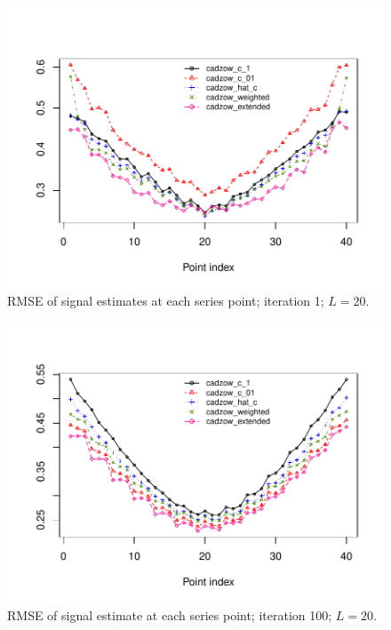 \documentclass[sii]{ipart}
\begin{document}
\begin{figure}[!hhh]
		\includegraphics[width = \columnwidth]{s1_it1.pdf}
		\caption{RMSE of signal estimates at each series point; iteration 1; $L=20$.}
		\label{fig:s1_it1}
\end{figure}

\begin{figure}[!hhh]
		\includegraphics[width = \columnwidth]{s1_it100.pdf}
		\caption{RMSE of signal estimate at each series point; iteration 100; $L=20$.}
		\label{fig:s1_it100}
\end{figure}
\end{document}
